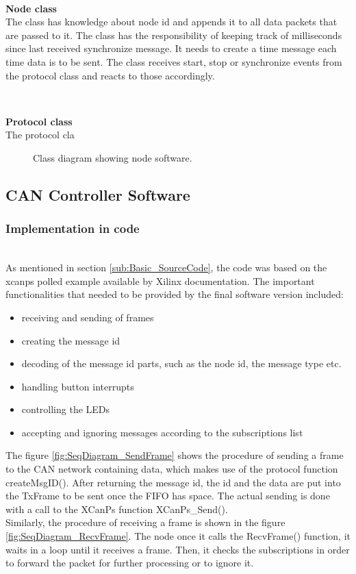 ~\\ \par \textbf{Node class} ~ \\
The class has knowledge about node id and appends it to all data packets that are passed to it.
The class has the responsibility of keeping track of milliseconds since last received synchronize message.
It needs to create a time message each time data is to be sent.
The class receives start, stop or synchronize events from the protocol class and reacts to those accordingly.

~\\ \par \textbf{Protocol class} ~ \\
The protocol cla

\begin{figure}[!h]
\centering
{}
\caption{Class diagram showing node software.}
\label{fig:node_class_diagram}
\end{figure}

\subsection{CAN Controller Software}
\subsubsection{Implementation in code}~\\
As mentioned in section \ref{sub:Basic_SourceCode}, the code was based on the xcanps polled example available by Xilinx documentation.
The important functionalities that needed to be provided by the final software version included:
\begin{itemize}
\item receiving and sending of frames
\item creating the message id
\item decoding of the message id parts, such as the node id, the message type etc. 
\item handling button interrupts
\item controlling the LEDs
\item accepting and ignoring messages according to the subscriptions list
\end{itemize}
The figure \ref{fig:SeqDiagram_SendFrame} shows the procedure of sending a frame to the CAN network containing data, which makes use of the protocol function createMsgID().
After returning the message id, the id and the data are put into the TxFrame to be sent once the FIFO has space.
The actual sending is done with a call to the XCanPs function XCanPs\_Send().
\\
Similarly, the procedure of receiving a frame is shown in the figure \ref{fig:SeqDiagram_RecvFrame}.
The node once it calls the RecvFrame() function, it waits in a loop until it receives a frame. Then, it checks the subscriptions in order to forward the packet for further processing or to ignore it.


